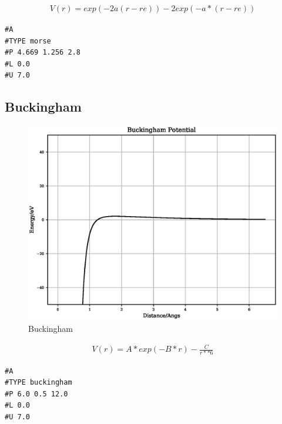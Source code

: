 \begin{equation}
\begin{split}
V(r) = exp(-2 a (r - re)) - 2 exp (-a*(r - re))
\end{split}
\label{eq:eqMorse}
\end{equation}

\begin{lstlisting}[style=sPseudo,caption={Morse}]
#A
#TYPE morse
#P 4.669 1.256 2.8
#L 0.0
#U 7.0
\end{lstlisting}





\clearpage
\FloatBarrier
\subsection{Buckingham}

\begin{figure}[h]
  \begin{center}
    \includegraphics[width=120mm]{appendix/functions/plots/buckingham.eps}
    \caption{Buckingham}
    \label{graph:BuckinghamPotential}
  \end{center}
\end{figure}

\begin{equation}
\begin{split}
V(r) = A * exp(-B * r) - \frac{C}{r**6}
\end{split}
\label{eq:eqBuckingham}
\end{equation}

\begin{lstlisting}[style=sPseudo,caption={Buckingham}]
#A
#TYPE buckingham
#P 6.0 0.5 12.0
#L 0.0
#U 7.0
\end{lstlisting}




